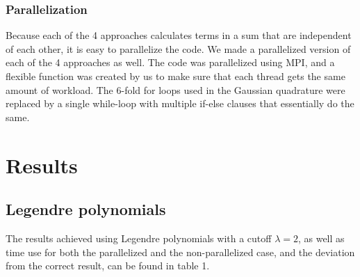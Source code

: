 \documentclass[10pt,a4paper]{article}
\begin{document}
\subsubsection{Parallelization}
Because each of the 4 approaches calculates terms in a sum that are independent of each other, it is easy to parallelize the code. We made a parallelized version of each of the 4 approaches as well. The code was parallelized using MPI, and a flexible function was created by us to make sure that each thread gets the same amount of workload. The 6-fold for loops used in the Gaussian quadrature were replaced by a single while-loop with multiple if-else clauses that essentially do the same.

\section{Results}
\subsection{Legendre polynomials}
The results achieved using Legendre polynomials with a cutoff $\lambda=2$, as well as time use for both the parallelized and the non-parallelized case, and the deviation from the correct result, can be found in table 1.
\end{document}
